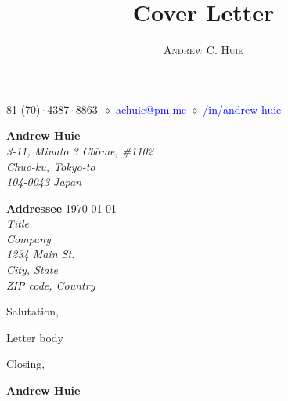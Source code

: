 \documentclass[12pt, a4paper]{article}
\makeatletter
\renewcommand{\maketitle}{
    \begin{center}
        {\Huge\theauthor}

        \vspace{0.25em}

        \raisebox{.3ex}{\footnotesize+}81 (70)\,$\cdot$\,4387\,$\cdot$\,8863~$\diamond$
        \href{mailto:achuie@pm.me}{\textcolor{blue}{
            achuie@pm.me
        }}$\diamond$
        \href{https://www.linkedin.com/in/andrew-huie/}{\textcolor{blue}{/in/andrew-huie}}

    \end{center}
}
\makeatother
\begin{document}
\title{Cover Letter}
\author{\textsc{Andrew C. Huie}}

\maketitle

\vspace{2em}

\begin{flushright}
    {\color{Gray}
    \textbf{Andrew Huie}\\
    \textsl{
        3-11, Minato 3 Ch$\bar{o}$me, \#1102\\
        Chuo-ku, Tokyo-to\\
        104-0043 Japan\\
    }}
\end{flushright}

\vspace{1em}

\textbf{Addressee} \hfill \today\\
\textsl{
    Title\\
    Company\\
    1234 Main St.\\
    City, State\\
    ZIP code, Country\\
}

Salutation,

\vspace{0.75em}

Letter body

\vspace{0.75em}

Closing,

\vspace{2em}

\textbf{Andrew Huie}
\end{document}
